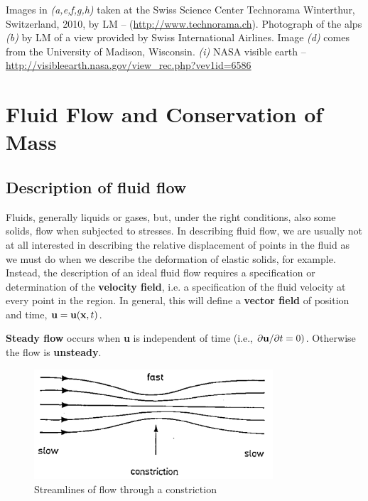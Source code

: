 \documentclass[10pt]{report}
\begin{document}
{\footnotesize Images in {\em(a,e,f,g,h)} taken at the Swiss Science Center Technorama
Winterthur, Switzerland, 2010, by LM -- (\url{http://www.technorama.ch}).
Photograph of the alps {\em (b)} by LM of a view provided by Swiss International Airlines.
Image {\em (d)} comes from the University of Madison, Wisconsin.
{\em(i)} NASA visible earth -- \url{http://visibleearth.nasa.gov/view_rec.php?vev1id=6586} }

\tableofcontents

\chapter{Fluid Flow and Conservation of Mass}

%
%

\section{Description of fluid flow}

Fluids, generally liquids or gases, but, under the right conditions, also some solids, flow
when subjected to stresses. In describing fluid flow, we are usually not at all interested
in describing the relative displacement of points in the fluid as we must do when we
describe the deformation of elastic solids, for example. Instead, the description of an
ideal fluid flow requires a specification or determination of the \textbf{velocity field},
i.e. a specification of the fluid velocity at every point in the region. In general, this
will define a \textbf{vector field} of position and time, ${\bf u}={\bf u}({\bf x},t)$.

\textbf{Steady flow} occurs when \textbf{u} is independent of time (i.e.,  ${\partial {\bf u}}/{\partial t}=0)$. Otherwise the flow is  \textbf{unsteady}.

\begin{figure}[htbp]
\centerline{\includegraphics[width=3.5in]{Section3.pdf}}
\label{fig1.3}
\caption{ Streamlines of flow through a constriction}
\end{figure}
\end{document}
